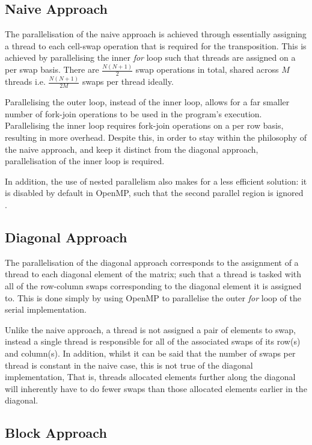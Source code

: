 \documentclass[journal,10pt]{IEEEtran}
\begin{document}
\subsection{Naive Approach}
The parallelisation of the naive approach is achieved through essentially assigning a thread to each cell-swap operation that is required for the transposition. This is achieved by parallelising the inner \textit{for} loop such that threads are assigned on a per swap basis. There are $\frac{N(N+1)}{2}$ swap operations in total, shared across $M$ threads i.e. $\frac{N(N+1)}{2M}$ swaps per thread ideally.

Parallelising the outer loop, instead of the inner loop, allows for a far smaller number of fork-join operations to be used in the program's execution. Parallelising the inner loop requires fork-join operations on a per row basis, resulting in more overhead. Despite this, in order to stay within the philosophy of the naive approach, and keep it distinct from the diagonal approach, parallelisation of the inner loop is required.

In addition, the use of nested parallelism also makes for a less efficient solution: it is disabled by default in OpenMP, such that the second parallel region is ignored \cite{Chapter356:online}.

\subsection{Diagonal Approach}
The parallelisation of the diagonal approach corresponds to the assignment of a thread to each diagonal element of the matrix; such that a thread is tasked with all of the row-column swaps corresponding to the diagonal element it is assigned to. This is done simply by using OpenMP to parallelise the outer \textit{for} loop of the serial implementation.

Unlike the naive approach, a thread is not assigned a pair of elements to swap, instead a single thread is responsible for all of the associated swaps of its row(s) and column(s). In addition, whilst it can be said that the number of swaps per thread is constant in the naive case, this is not true of the diagonal implementation, That is, threads allocated elements further along the diagonal will inherently have to do fewer swaps than those allocated elements earlier in the diagonal.

\subsection{Block Approach}
\end{document}
